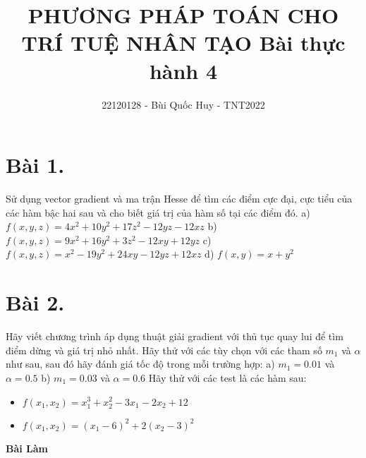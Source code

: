 \documentclass[11pt]{article}
\title{\textbf{PHƯƠNG PHÁP TOÁN CHO TRÍ TUỆ NHÂN TẠO \newline Bài thực hành 4}}
\author{22120128 - Bùi Quốc Huy - TNT2022}
\begin{document}
\maketitle

\section*{Bài 1.} 
Sử dụng vector gradient và ma trận Hesse để tìm các điểm cực đại, cực tiểu của các hàm bậc hai sau và cho biết giá trị của hàm số tại các điểm đó.
\newline a) $ f(x, y, z) = 4x^2 + 10y^2 + 17z^2 - 12yz - 12xz $
\newline b) $ f(x, y, z) = 9x^2 + 16y^2 + 3z^2 - 12xy + 12yz $
\newline c) $ f(x, y, z) = x^2 - 19y^2 + 24xy - 12yz + 12xz $
\newline d) $ f(x, y) = x + y^2 $ 

\section*{Bài 2.}
Hãy viết chương trình áp dụng thuật giải gradient với thủ tục quay lui để tìm điểm dừng và giá trị nhỏ nhất. Hãy thử với các tùy chọn với các tham số $ m_1 $ và $ \alpha $ như sau, sau đó hãy đánh giá tốc độ trong mỗi trường hợp:
\newline a) $ m_1 = 0.01 $ và $ \alpha = 0.5 $
\newline b) $ m_1 = 0.03 $ và $ \alpha = 0.6 $
\newline Hãy thử với các test là các hàm sau:
\begin{itemize}
    \item $ f(x_1, x_2) = x_1^3 + x_2^2 - 3x_1 - 2x_2 + 12 $
    \item $ f(x_1, x_2) = (x_1 - 6)^2 + 2(x_2 - 3)^2 $
\end{itemize}

\begin{center}
    \textbf{Bài Làm}
\end{center}
 
\end{document}
